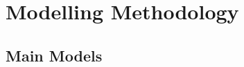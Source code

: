 \documentclass[12pt]{article}
\renewcommand{\textcite}[1]{\citeauthor{#1} (\citeyear{#1})}
\begin{document}
%
%


\section{Modelling Methodology}

\subsection{Main Models}
\end{document}
